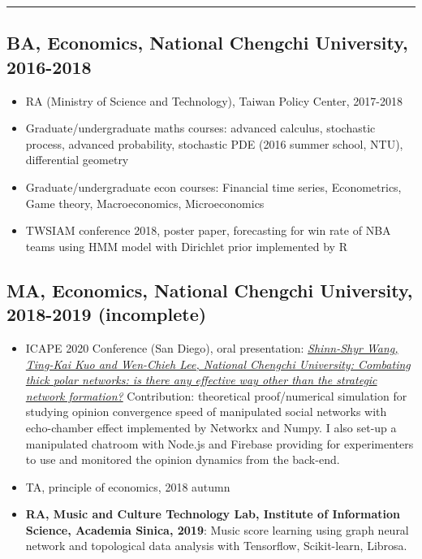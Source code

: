 \documentclass[11pt]{article}
\begin{document}
\begin{multicols*}{2}
\hrule

\columnbreak

\begin{educationbox}
\subsection*{BA, Economics, National Chengchi University, 2016-2018}

    \begin{itemize}[noitemsep]
        \item RA (Ministry of Science and Technology), Taiwan Policy Center, 2017-2018
        \item Graduate/undergraduate maths courses: advanced calculus, stochastic process, advanced probability, stochastic PDE (2016 summer school, NTU), differential geometry
        \item Graduate/undergraduate econ courses: Financial time series, Econometrics, Game theory, Macroeconomics, Microeconomics
        \item TWSIAM conference 2018, poster paper, forecasting for win rate of NBA teams using HMM model with Dirichlet prior implemented by R
    \end{itemize}


\subsection*{MA, Economics, National Chengchi University, 2018-2019 (incomplete)}

    \begin{itemize}[noitemsep]
        \item ICAPE 2020 Conference (San Diego), oral presentation: \href{https://ah.lib.nccu.edu.tw/item?item_id=163948&locale=en}{\textit{Shinn-Shyr Wang, Ting-Kai Kuo and Wen-Chieh Lee, National Chengchi University: Combating thick polar networks: is there any effective way other than the strategic network formation?}} Contribution: theoretical proof/numerical simulation for studying opinion convergence speed of manipulated social networks with echo-chamber effect implemented by Networkx and Numpy. I also set-up a manipulated chatroom with Node.js and Firebase providing for experimenters to use and monitored the opinion dynamics from the back-end.
        \item TA, principle of economics, 2018 autumn
    
        \item \textbf{RA, Music and Culture Technology Lab, Institute of Information Science, Academia Sinica, 2019}: Music score learning using graph neural network and topological data analysis with Tensorflow, Scikit-learn, Librosa.
        

\end{itemize}
\end{educationbox}
\end{multicols*}
\end{document}

